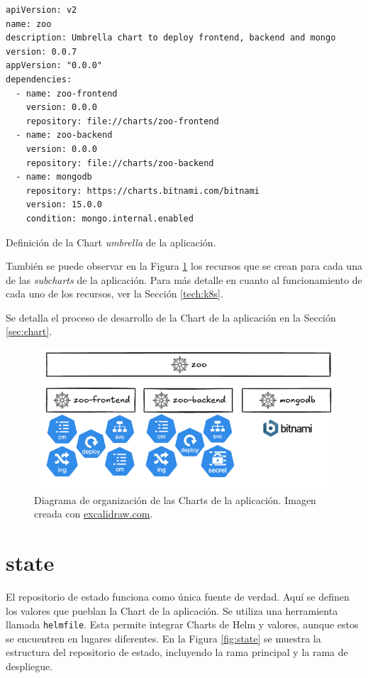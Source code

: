 \begin{listing}[!ht]
  \begin{verbatim}
apiVersion: v2
name: zoo
description: Umbrella chart to deploy frontend, backend and mongo
version: 0.0.7
appVersion: "0.0.0"
dependencies:
  - name: zoo-frontend
    version: 0.0.0
    repository: file://charts/zoo-frontend
  - name: zoo-backend
    version: 0.0.0
    repository: file://charts/zoo-backend
  - name: mongodb
    repository: https://charts.bitnami.com/bitnami
    version: 15.0.0
    condition: mongo.internal.enabled
  \end{verbatim}
  \caption{Definición de la Chart \textit{umbrella} de la aplicación.}
  \label{lst:umbrella}
\end{listing}

También se puede observar en la Figura \ref{fig:helm-repository} los recursos que se crean para cada una de las \textit{subcharts} de la aplicación. Para más detalle en cuanto al funcionamiento de cada uno de los recursos, ver la Sección \ref{tech:k8s}.

Se detalla el proceso de desarrollo de la Chart de la aplicación en la Sección \ref{sec:chart}.

\begin{figure}
  \centerline{\includegraphics[width=13cm]{figuras/helm-repository}}
  \caption{Diagrama de organización de las Charts de la aplicación. Imagen creada con \href{https://excalidraw.com}{excalidraw.com}.}
  \label{fig:helm-repository}
\end{figure}

\section{state}
\label{subsec:state}

El repositorio de estado funciona como única fuente de verdad. Aquí se definen  los valores que pueblan la Chart de la aplicación. Se utiliza una herramienta llamada \texttt{helmfile}\cite{helmfile}. Esta permite integrar Charts de Helm y valores, aunque estos se encuentren en lugares diferentes. En la Figura \ref{fig:state} se muestra la estructura del repositorio de estado, incluyendo la rama principal y la rama de despliegue.

